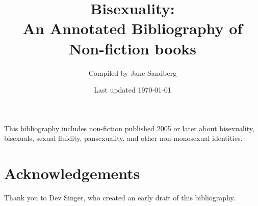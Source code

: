 \documentclass[12pt]{article}
\title{Bisexuality: \\An Annotated Bibliography of Non-fiction books}
\author{Compiled by Jane Sandberg}
\date{Last updated \today}
\begin{document}
\maketitle

 
 This bibliography includes non-fiction published 2005 or later about bisexuality, bisexuals, sexual fluidity, pansexuality, and other non-monosexual identities.
 
 
 \newpage
 \tableofcontents

 
 \nocite{*}
 
 \printbibliography[title={General non-fiction},keyword={general},heading=bibnumbered]
 \printbibliography[title={Biography},keyword={biography},heading=bibnumbered]
 \printbibliography[title={Documentary films},keyword={documentary},heading=bibnumbered]
 
 \section{Acknowledgements}
 Thank you to Dev Singer, who created an early draft of this bibliography.
\end{document}
